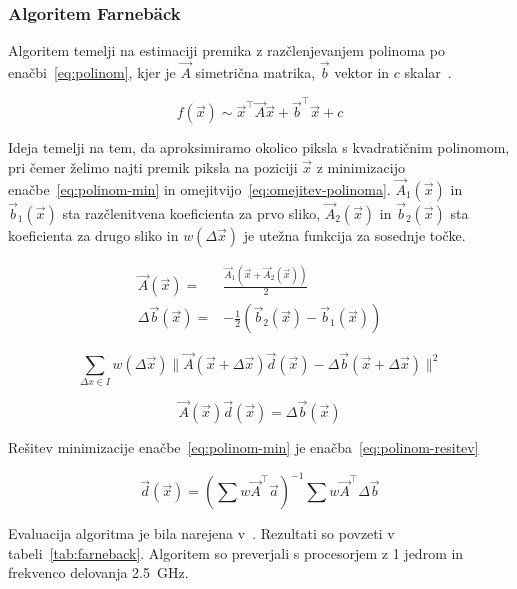 \subsubsection{Algoritem Farneb{\"a}ck}
Algoritem temelji na estimaciji premika z razčlenjevanjem polinoma  po enačbi~\eqref{eq:polinom}, kjer je $\vec{A}$ simetrična matrika, $\vec{b}$ vektor in $c$ skalar~\cite{farneback2003two}.

\begin{equation}\label{eq:polinom}
	f(\vec{x}) \sim \vec{x}^\top \vec{A} \vec{x} + \vec{b}^\top \vec{x} + c
\end{equation}

Ideja temelji na tem, da aproksimiramo okolico piksla s kvadratičnim polinomom, pri čemer želimo najti premik piksla na poziciji $\vec{x}$ z minimizacijo enačbe~\eqref{eq:polinom-min} in omejitvijo~\eqref{eq:omejitev-polinoma}. $\vec{A}_1(\vec{x})$ in $\vec{b}_1(\vec{x})$ sta razčlenitvena koeficienta za prvo sliko, $\vec{A}_2(\vec{x})$ in $\vec{b}_2(\vec{x})$ sta koeficienta za drugo sliko in $w(\Delta\vec{x})$ je utežna funkcija za sosednje točke.

\begin{align}
\vec{A}(\vec{x}) = & \frac{\vec{A}_1(\vec{x} + \vec{A}_2(\vec{x}))}{2} \\
\Delta\vec{b}(\vec{x}) = & - \frac{1}{2}\left(\vec{b}_2(\vec{x}) - \vec{b}_1(\vec{x})\right) 
\end{align}

\begin{equation}\label{eq:polinom-min}
\sum_{\Delta x \in I} w(\Delta\vec{x}) \| \vec{A}(\vec{x} + \Delta\vec{x})\vec{d}(\vec{x}) - \Delta\vec{b}(\vec{x} +\Delta\vec{x}) \|^2
\end{equation}

\begin{equation}\label{eq:omejitev-polinoma}
\vec{A}(\vec{x})\vec{d}(\vec{x}) = \Delta\vec{b}(\vec{x})
\end{equation}

Rešitev minimizacije enačbe~\eqref{eq:polinom-min} je enačba~\eqref{eq:polinom-resitev}

\begin{equation}\label{eq:polinom-resitev}
 \vec{d}(\vec{x}) = \left( \sum w \vec{A}^\top \vec{a} \right)^{-1} \sum w \vec{A}^\top \Delta\vec{b}
\end{equation}

Evaluacija algoritma je bila narejena v~\cite{Geiger2012CVPR}. Rezultati so povzeti v tabeli~\ref{tab:farneback}. Algoritem so preverjali s procesorjem z 1 jedrom in frekvenco delovanja \SI{2.5}{GHz}.

